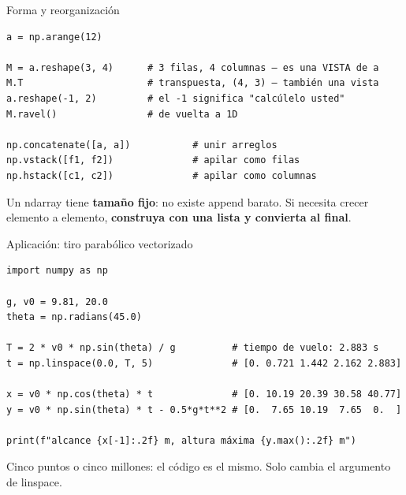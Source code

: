 \documentclass[aspectratio=169, 11pt]{beamer}
\newcommand{\code}[1]{{\ttfamily\small\color{textoOscuro}#1}}
\begin{document}
\begin{frame}[fragile]{Forma y reorganización}
\begin{lstlisting}
a = np.arange(12)

M = a.reshape(3, 4)      # 3 filas, 4 columnas — es una VISTA de a
M.T                      # transpuesta, (4, 3) — también una vista
a.reshape(-1, 2)         # el -1 significa "calcúlelo usted"
M.ravel()                # de vuelta a 1D

np.concatenate([a, a])           # unir arreglos
np.vstack([f1, f2])              # apilar como filas
np.hstack([c1, c2])              # apilar como columnas
\end{lstlisting}

Un ndarray tiene \textbf{tamaño fijo}: no existe \code{append} barato. Si
necesita crecer elemento a elemento, \textbf{construya con una lista y
convierta al final}.
\end{frame}

\begin{frame}[fragile]{Aplicación: tiro parabólico vectorizado}
\begin{lstlisting}
import numpy as np

g, v0 = 9.81, 20.0
theta = np.radians(45.0)

T = 2 * v0 * np.sin(theta) / g          # tiempo de vuelo: 2.883 s
t = np.linspace(0.0, T, 5)              # [0. 0.721 1.442 2.162 2.883]

x = v0 * np.cos(theta) * t              # [0. 10.19 20.39 30.58 40.77]
y = v0 * np.sin(theta) * t - 0.5*g*t**2 # [0.  7.65 10.19  7.65  0.  ]

print(f"alcance {x[-1]:.2f} m, altura máxima {y.max():.2f} m")
\end{lstlisting}

Cinco puntos o cinco millones: el código es el mismo. Solo cambia el argumento
de \code{linspace}.
\end{frame}
\end{document}
